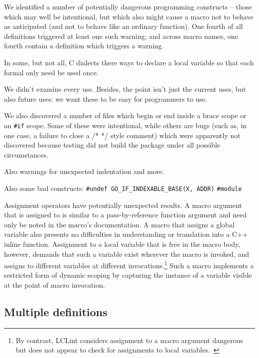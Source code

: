 \documentclass[10pt]{article}
\begin{document}
        We identified a number of potentially dangerous programming
          constructs -- those which may well be intentional, but which also
          might cause a macro not to behave as anticipated (and not to
          behave like an ordinary function).  One fourth of all definitions
          triggered at least one such warning; and across macro names,
          one fourth contain a definition which triggers a warning.

{}


{}

        In some, but not all, C dialects there ways to declare a local
          variable so that each formal only need be used once.

        We didn't examine every use.  Besides, the point isn't just the
          current uses, but also future uses:  we want these to be easy for
          programmers to use.

        We also discovered a number of files which begin or end inside a
          brace scope or an {\tt \#if} scope.  Some of these were intentional, while
          others are bugs (such as, in one case, a failure to close a /* */
          style comment) which were apparently not discovered because testing
          did not build the package under all possible circumstances.

        Also warnings for unexpected indentation and more.

        Also some bad constructs:
          {\tt \#undef \verb|GO_IF_INDEXABLE_BASE|(X, ADDR)}
          {\tt \#module}

Assignment operators have potentially unexpected results.  A macro argument
that is assigned to is similar to a pass-by-reference function argument and
need only be noted in the macro's documentation.  A macro that assigns a
global variable also presents no difficulties in understanding or
translation into a C++ inline function.  Assignment to a local variable
that is free in the macro body, however, demands that such a variable exist
wherever the macro is invoked, and assigns to different variables at
different invocations.\footnote{By contrast, LCLint considers assignment to
  a macro argument dangerous but does not appear to check for assignments
  to local variables.~\cite{Evans:LCLint}} Such a macro implements a
restricted form of dynamic scoping by capturing the instance of a variable
visible at the point of macro invocation.

\subsection{Multiple definitions}
\end{document}
